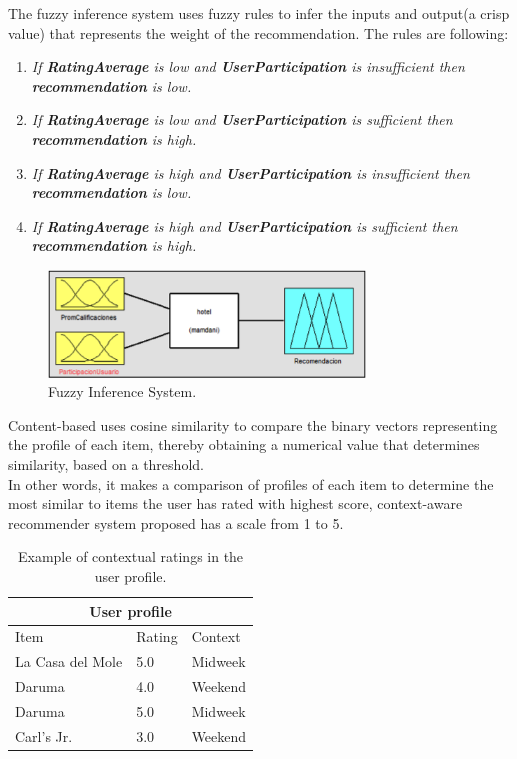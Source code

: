 The fuzzy inference system uses fuzzy rules to infer the inputs and 
output(a crisp value) that represents the weight of the recommendation. 
The rules are following: 
\begin{enumerate}
\item \textit{If \textbf{RatingAverage} is low and 
\textbf{UserParticipation} is insufficient then \textbf{recommendation} is low.}
\item \textit{If \textbf{RatingAverage} is low and 
\textbf{UserParticipation} is sufficient then \textbf{recommendation} is high.}
\item \textit{If \textbf{RatingAverage} is high and 
\textbf{UserParticipation} is insufficient then \textbf{recommendation} is low.}
\item \textit{If \textbf{RatingAverage} is high and 
\textbf{UserParticipation} is sufficient then \textbf{recommendation} is high.}
\end{enumerate}
\begin{figure}
\captionsetup{justification=centering,margin=2cm,font=footnotesize}
\centering
\setlength\fboxsep{0pt}
\setlength\fboxrule{0.7pt}
\includegraphics[width=0.75\textwidth]{img/fis.png}
\caption{Fuzzy Inference System.}
\label{fig:fis}   
\end{figure}
Content-based uses cosine similarity to compare the binary
vectors representing the profile of each item, thereby obtaining a
numerical value that determines similarity, based on a threshold. \\   In
other words, it makes a comparison of profiles of each item to
determine the most similar to items the user has rated with highest
score, context-aware recommender system proposed has a scale from 1 to
5. 
\begin{table}[htb]
\small
\centering
\captionsetup{font=footnotesize}
\caption{Example of contextual ratings in the user profile.}
\label{tab:2}
\small
\begin{tabular}{lll}
\hline
\multicolumn{3}{c}{\textbf{User profile}} \\ \hline
Item & Rating & Context \\ \hline
La Casa del Mole & 5.0 & Midweek \\ 
Daruma           & 4.0 & Weekend \\ 
Daruma           & 5.0 & Midweek \\ 
Carl's Jr.       & 3.0 & Weekend \\ \hline
\end{tabular}
\end{table}
